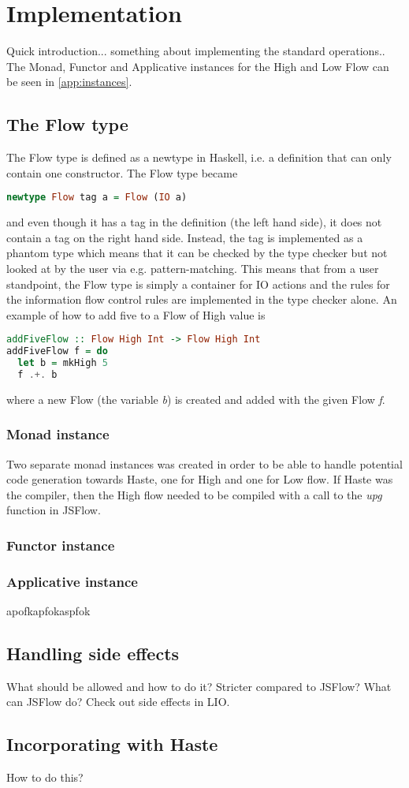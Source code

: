 \section{Implementation}
\label{chapter:implementation}
Quick introduction... something about implementing the standard operations..
The Monad, Functor and Applicative instances for the High and Low Flow can be seen in \ref{app:instances}.
\subsection{The Flow type}
\label{sec:flow}
The Flow type is defined as a newtype in Haskell, i.e. a definition that can only contain one constructor. The Flow type became
\begin{lstlisting}[language=Haskell, xleftmargin=.2\textwidth, xrightmargin=.2\textwidth]
newtype Flow tag a = Flow (IO a)
\end{lstlisting}
and even though it has a tag in the definition (the left hand side), it does not contain a tag on the right hand side. Instead, the tag is implemented as a phantom type\cite{haskell_phantom} which means that it can be checked by the type checker but not looked at by the user via e.g. pattern-matching. This means that from a user standpoint, the Flow type is simply a container for IO actions and the rules for the information flow control rules are implemented in the type checker alone. An example of how to add five to a Flow of High value is
\begin{lstlisting}[language=Haskell]
addFiveFlow :: Flow High Int -> Flow High Int
addFiveFlow f = do
  let b = mkHigh 5
  f .+. b
\end{lstlisting}
where a new Flow (the variable \emph{b}) is created and added with the given Flow \emph{f}.
\subsubsection{Monad instance}
Two separate monad instances was created in order to be able to handle potential code generation towards Haste, one for High and one for Low flow. If Haste was the compiler, then the High flow needed to be compiled with a call to the \emph{upg} function in JSFlow.
\subsubsection{Functor instance}

\subsubsection{Applicative instance}
apofkapfokaspfok

\subsection{Handling side effects}
What should be allowed and how to do it?
Stricter compared to JSFlow?
What can JSFlow do?
Check out side effects in LIO.

\subsection{Incorporating with Haste}
How to do this?
